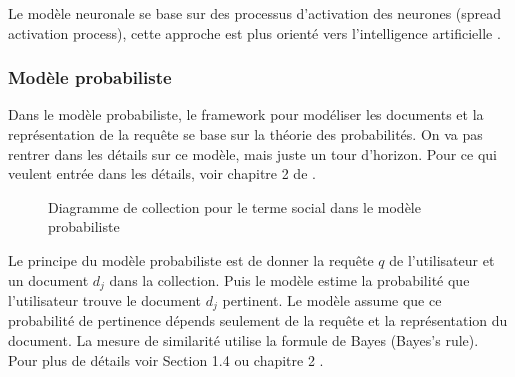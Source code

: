Le modèle neuronale se base sur des processus d'activation des neurones (spread activation process), cette approche est plus orienté vers l’intelligence artificielle \citep*{modern-ir}.

\subsubsection{Modèle probabiliste}
Dans le modèle probabiliste, le framework pour modéliser les documents et la représentation de la requête se base sur la théorie des probabilités. On va pas rentrer dans les détails sur ce modèle, mais juste un tour d'horizon. Pour ce qui veulent entrée dans les détails, voir chapitre 2 de \citep{modern-ir}.

\begin{figure}[htbp]
    \begin{center}
    \end{center}
    \caption{Diagramme de collection pour le terme social dans le modèle probabiliste \citep{model-ir}}
    \label{fig:probabilistic-model}
\end{figure}

Le principe du modèle probabiliste est de donner la requête $q$ de l'utilisateur et un document $d_{j}$ dans la collection. Puis le modèle estime la probabilité que l'utilisateur trouve le document $d_{j}$ pertinent. Le modèle assume que ce probabilité de pertinence dépends seulement de la requête et la représentation du document. La mesure de similarité utilise la formule de Bayes (Bayes's rule). Pour plus de détails voir Section 1.4 \citep{model-ir} ou chapitre 2 \citep{modern-ir}.


